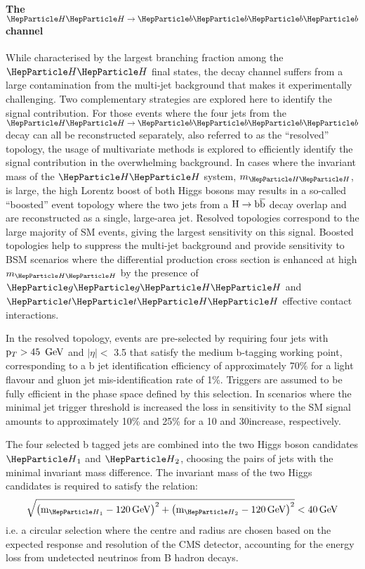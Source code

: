 \paragraph{The $\HH\to\bbbb$ channel}

While characterised by the largest branching fraction among the $\HH$ final states, the \bbbb decay channel suffers from a large contamination from the multi-jet background that makes it experimentally challenging.
Two complementary strategies are explored here to identify the signal contribution.
For those events where the four jets from the $\HH\to\bbbb$ decay can all be reconstructed separately, also referred to as the ``resolved'' topology, the usage of multivariate methods is explored to efficiently identify the signal contribution in the overwhelming background.
In cases where the invariant mass of the $\HH$ system, $m_{\HH}$, is large, the high Lorentz boost of both Higgs bosons may results in a so-called ``boosted'' event topology where the two jets from a $\text{H}\rightarrow\text{b}\overline{\text{b}}$ decay overlap and are reconstructed as a single, large-area jet.
Resolved topologies correspond to the large majority of SM \HH events, giving the largest sensitivity on this signal.
Boosted topologies help to suppress the multi-jet background and provide sensitivity to BSM scenarios where the differential \HH production cross section is enhanced at high $m_{\HH}$ by the presence of $\Pg\Pg\HH$ and $\PQt\PQt\HH$ effective contact interactions.

In the resolved topology, events are pre-selected by requiring four jets with $\mathrm{p}_{T} > 45~\,\text{Ge\hspace{-.08em}V}$ and $|\eta| <$ 3.5 that satisfy the medium b-tagging working point, corresponding to a b jet identification efficiency of approximately 70\% for a light  flavour and gluon jet mis-identification rate of  1\%.
Triggers are assumed to be fully efficient in the phase space defined by this selection.
In scenarios where the minimal jet trigger \pt threshold is increased the loss in sensitivity to the SM signal amounts to approximately 10\% and 25\% for a 10 and 30\GeV increase, respectively.

The four selected b tagged jets are combined into the two Higgs boson candidates $\PH_1$ and $\PH_2$, choosing the pairs of jets with the minimal invariant mass difference.
The invariant mass of the two Higgs candidates is required to satisfy the relation:
\begin{equation}
\sqrt{ \left( \text{m}_{\PH_1} - 120\GeV\right)^2 + \left( \text{m}_{\PH_2} - 120\GeV\right)^2 } < 40\GeV
\end{equation}
i.e. a circular selection where the centre and radius are chosen based on the expected response and resolution of the CMS detector, accounting for the energy loss from undetected neutrinos from B hadron decays.


